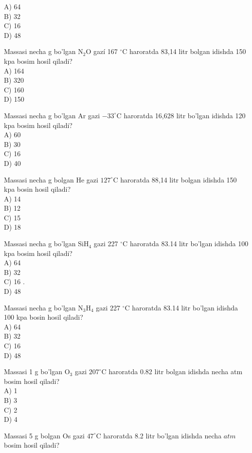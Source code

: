 A) 64\\
B) 32\\
C) 16\\
D) 48
  \item Massasi necha g bo'lgan $\mathrm{N}_{2} \mathrm{O}$ gazí 167 ${ }^{\circ} \mathrm{C}$ haroratda 83,14 litr bolgan idishda 150 kpa bosim hosil qiladi?\\
A) 164\\
B) 320\\
C) 160\\
D) 150
  \item Massasi necha g bo'lgan Ar gazi $-33^{\circ} \mathrm{C}$ haroratda 16,628 litr bo'lgan idishda 120 kpa bosim hosil qiladi?\\
A) 60\\
B) 30\\
C) 16\\
D) 40
  \item Massasi necha g bolgan He gazi $127^{\circ} \mathrm{C}$ haroratda 88,14 litr bolgan idishda 150 kpa bosin hosil qiladi?\\
A) 14\\
B) 12\\
C) 15\\
D) 18
  \item Massasi necha g bo'lgan $\mathrm{SiH}_{4}$ gazi 227 ${ }^{\circ} \mathrm{C}$ haroratda 83.14 litr bo'lgan idishda 100 kpa bosim hosil qiladi?\\
A) 64\\
B) 32\\
C) 16 .\\
D) 48
  \item Massasi necha g bo'lgan $\mathrm{N}_{3} \mathrm{H}_{4}$ gazi 227 ${ }^{\circ} \mathrm{C}$ haroratda 83.14 litr bo'lgan idishda 100 kpa bosin hosil qiladi?\\
A) 64\\
B) 32\\
C) 16\\
D) 48
  \item Massasi 1 g bo'lgan $\mathrm{O}_{3}$ gazi $207^{\circ} \mathrm{C}$ haroratda 0.82 litr bolgan idishda necha atm bosim hosil qiladi?\\
A) 1\\
B) 3\\
C) 2\\
D) 4
  \item Massasi 5 g bolgan Os gazi $47^{\circ} \mathrm{C}$ haroratda 8.2 litr bo'lgan idishda necha $a t m$ bosim hosil qiladi?\\
